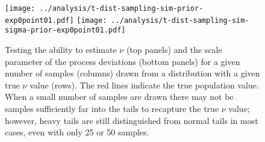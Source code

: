 \clearpage

\begin{figure}[htbp]
\begin{center}
\texttt{[image: ../analysis/t-dist-sampling-sim-prior-exp0point01.pdf]}
\texttt{[image: ../analysis/t-dist-sampling-sim-sigma-prior-exp0point01.pdf]}
\caption{
  Testing the ability to estimate $\nu$ (top panels) and the scale parameter of
  the process deviations (bottom panels) for a given number of samples (columns)
  drawn from a distribution with a given true $\nu$ value (rows). The red lines
  indicate the true population value. When a small number of samples are drawn
  there may not be samples sufficiently far into the tails to recapture the
  true $\nu$ value; however, heavy tails are still distinguished from normal
  tails in most cases, even with only 25 or 50 samples.
}
\label{fig:sim-nu}
\end{center}
\end{figure}

\clearpage


